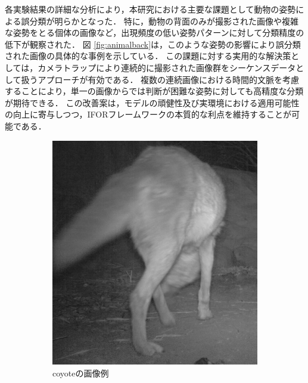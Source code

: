 \documentclass[a4paper,11pt,nomag]{jsreport}
\begin{document}
各実験結果の詳細な分析により，本研究における主要な課題として動物の姿勢による誤分類が明らかとなった．
特に，動物の背面のみが撮影された画像や複雑な姿勢をとる個体の画像など，出現頻度の低い姿勢パターンに対して分類精度の低下が観察された．
図 \ref{fig:animalback}は，このような姿勢の影響により誤分類された画像の具体的な事例を示している．
この課題に対する実用的な解決策としては，カメラトラップにより連続的に撮影された画像群をシーケンスデータとして扱うアプローチが有効である．
複数の連続画像における時間的文脈を考慮することにより，単一の画像からでは判断が困難な姿勢に対しても高精度な分類が期待できる．
この改善案は，モデルの頑健性及び実環境における適用可能性の向上に寄与しつつ，IFORフレームワークの本質的な利点を維持することが可能である．

\begin{figure}[tbp]
  \centering
  \begin{subfigure}[b]{0.45\linewidth}
    \centering
    \includegraphics[height=0.9\linewidth, keepaspectratio]{image/coyote.png}
    \caption{coyoteの画像例}
    \label{fig:coyote}
  \end{subfigure}
  \hfill
  \begin{subfigure}[b]{0.45\linewidth}
    \centering

\end{subfigure}
\end{figure}
\end{document}
